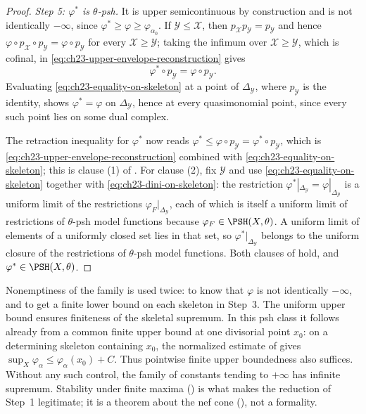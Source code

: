 \begin{proof}
\emph{Step 5: $\varphi^*$ is $\theta$-psh.}  It is upper semicontinuous
by construction and is not identically $-\infty$, since
$\varphi^*\geq\varphi\geq\varphi_{\alpha_0}$.  If
$\mathcal Y\leq\mathcal X$, then
$p_{\mathcal X}p_{\mathcal Y}=p_{\mathcal Y}$ and hence
$\varphi\circ p_{\mathcal X}\circ p_{\mathcal Y}
=\varphi\circ p_{\mathcal Y}$ for every $\mathcal X\geq\mathcal Y$;
taking the infimum over $\mathcal X\geq\mathcal Y$, which is cofinal, in
\eqref{eq:ch23-upper-envelope-reconstruction} gives
\begin{equation}\label{eq:ch23-equality-on-skeleton}
                   \varphi^*\circ p_{\mathcal Y}
                   =\varphi\circ p_{\mathcal Y}.
\end{equation}
Evaluating \eqref{eq:ch23-equality-on-skeleton} at a point of
$\Delta_{\mathcal Y}$, where $p_{\mathcal Y}$ is the identity, shows
$\varphi^*=\varphi$ on $\Delta_{\mathcal Y}$, hence at every
quasimonomial point, since every such point lies on some dual complex.

The retraction inequality for $\varphi^*$ now reads
$\varphi^*\leq\varphi\circ p_{\mathcal Y}=\varphi^*\circ p_{\mathcal Y}$,
which is \eqref{eq:ch23-upper-envelope-reconstruction} combined with
\eqref{eq:ch23-equality-on-skeleton}; this is clause (1) of
.  For clause (2), fix $\mathcal Y$ and use
\eqref{eq:ch23-equality-on-skeleton} together with
\eqref{eq:ch23-dini-on-skeleton}: the restriction
$\varphi^*|_{\Delta_{\mathcal Y}}=\varphi|_{\Delta_{\mathcal Y}}$ is a
uniform limit of the restrictions $\varphi_F|_{\Delta_{\mathcal Y}}$, each
of which is itself a uniform limit of restrictions of $\theta$-psh model
functions because $\varphi_F\in\PSH(X,\theta)$.  A uniform limit of
elements of a uniformly closed set lies in that set, so
$\varphi^*|_{\Delta_{\mathcal Y}}$ belongs to the uniform closure of the
restrictions of $\theta$-psh model functions.  Both clauses of
 hold, and $\varphi^*\in\PSH(X,\theta)$.
\end{proof}

\begin{remark}
\label{rem:ch23-upper-envelope-hypotheses}
Nonemptiness of the family is used twice: to know that $\varphi$ is not
identically $-\infty$, and to get a finite lower bound on each skeleton in
Step~3.  The uniform upper bound ensures finiteness of the skeletal
supremum.  In this psh class it follows already from a common finite
upper bound at one divisorial point $x_0$: on a determining skeleton
containing $x_0$, the normalized estimate of
 gives
$\sup_X\varphi_\alpha\leq\varphi_\alpha(x_0)+C$.  Thus pointwise
finite upper boundedness also suffices.  Without any such control, the
family of constants tending to $+\infty$ has infinite supremum.
Stability under finite maxima
() is what makes the reduction of
Step~1 legitimate; it is a theorem about the nef cone
(), not a formality.
\end{remark}

